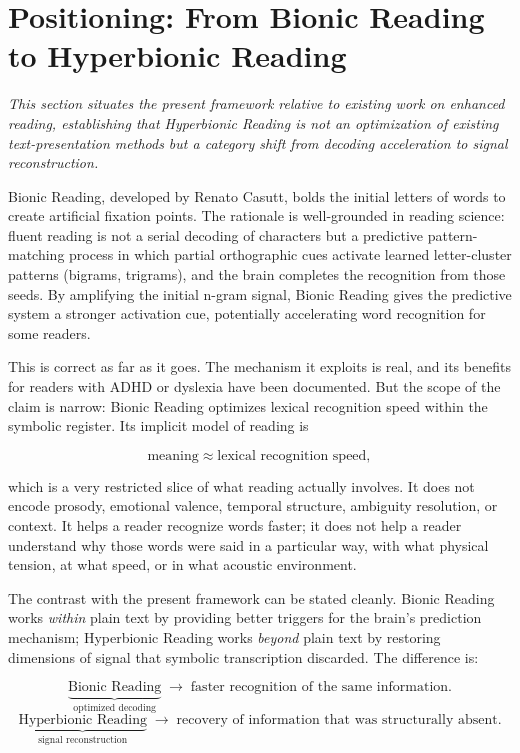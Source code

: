\documentclass[12pt, a4paper]{article}
\begin{document}
\section{Positioning: From Bionic Reading to Hyperbionic Reading}

\noindent\textit{This section situates the present framework relative to existing work on enhanced reading, establishing that Hyperbionic Reading is not an optimization of existing text-presentation methods but a category shift from decoding acceleration to signal reconstruction.}

Bionic Reading, developed by Renato Casutt, bolds the initial letters of words to create artificial fixation points. The rationale is well-grounded in reading science: fluent reading is not a serial decoding of characters but a predictive pattern-matching process in which partial orthographic cues activate learned letter-cluster patterns (bigrams, trigrams), and the brain completes the recognition from those seeds. By amplifying the initial n-gram signal, Bionic Reading gives the predictive system a stronger activation cue, potentially accelerating word recognition for some readers.

This is correct as far as it goes. The mechanism it exploits is real, and its benefits for readers with ADHD or dyslexia have been documented. But the scope of the claim is narrow: Bionic Reading optimizes lexical recognition speed within the symbolic register. Its implicit model of reading is

\begin{equation}
\text{meaning} \approx \text{lexical recognition speed},
\label{eq:bionic_model}
\end{equation}

which is a very restricted slice of what reading actually involves. It does not encode prosody, emotional valence, temporal structure, ambiguity resolution, or context. It helps a reader recognize words faster; it does not help a reader understand why those words were said in a particular way, with what physical tension, at what speed, or in what acoustic environment.

The contrast with the present framework can be stated cleanly. Bionic Reading works \emph{within} plain text by providing better triggers for the brain's prediction mechanism; Hyperbionic Reading works \emph{beyond} plain text by restoring dimensions of signal that symbolic transcription discarded. The difference is:

\begin{equation}
\underbrace{\text{Bionic Reading}}_{\text{optimized decoding}} \;\longrightarrow\; \text{faster recognition of the same information}.
\label{eq:bionic_vs}
\end{equation}
\begin{equation}
\underbrace{\text{Hyperbionic Reading}}_{\text{signal reconstruction}} \;\longrightarrow\; \text{recovery of information that was structurally absent}.
\label{eq:hyperbionic_vs}
\end{equation}
\end{document}
